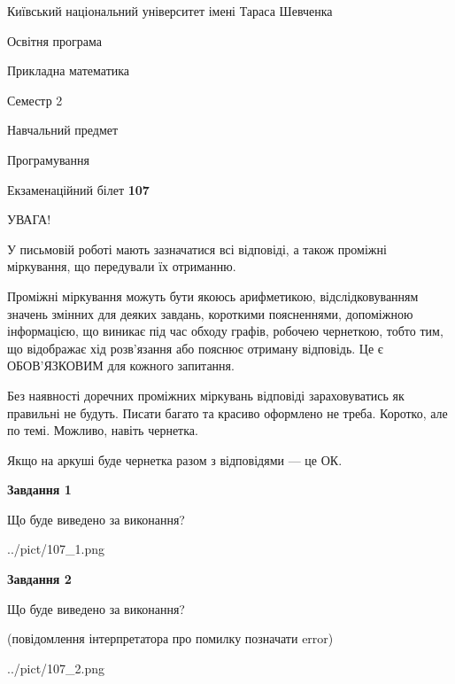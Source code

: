 \documentclass[12pt, ukrainian]{article}
\begin{document}
{{\begin {small}\par
{ \center  Київський національний університет імені Тараса Шевченка \par}
{\parbox {5 cm}{Освітня програма \hfill}{\parbox {7 cm}{Прикладна математика\hfill}}\parbox {6 cm}{\hfill Семестр 2}}\par
{\parbox {5 cm} {Навчальний предмет \hfill}\parbox {7 cm}{Програмування \hfill}\parbox {6cm}{\hfill}\par}\vspace{-7pt} \end{small}}{\center Екзаменаційний білет \No \textbf
{ 107 }\par}}
{
\begin {large}
УВАГА!

У письмовій роботі мають зазначатися всі відповіді, а також проміжні міркування, що передували їх отриманню.

Проміжні міркування можуть бути якоюсь арифметикою, відслідковуванням зна\-чень змінних для деяких завдань,
короткими поясненнями, допоміжною інформацією, що виникає під час обходу графів, робочею чернеткою,
тобто тим, що відображає хід розв’язання або пояснює отриману відповідь.
Це є ОБОВ’ЯЗКОВИМ для кожного запитання.

Без наявності доречних проміжних міркувань відповіді зараховуватись як правиль\-ні не будуть.
Писати багато та красиво оформлено не треба. Коротко, але по темі. Можли\-во, навіть чернетка.

Якщо на аркуші буде чернетка разом з відповідями --- це ОК.

\newpage

{\begin {center}\textbf{Завдання 1}\end {center}}\par
Що буде виведено за виконання?\par
\begin{center}
	{../pict/107_1.png}
\end{center}
\newpage

{\begin {center}\textbf{Завдання 2}\end {center}}\par
Що буде виведено за виконання?\par
 (повідомлення інтерпретатора про помилку позначати error)\par
\begin{center}
	{../pict/107_2.png}
\end{center}
\newpage


\end{large}}
\end{document}

